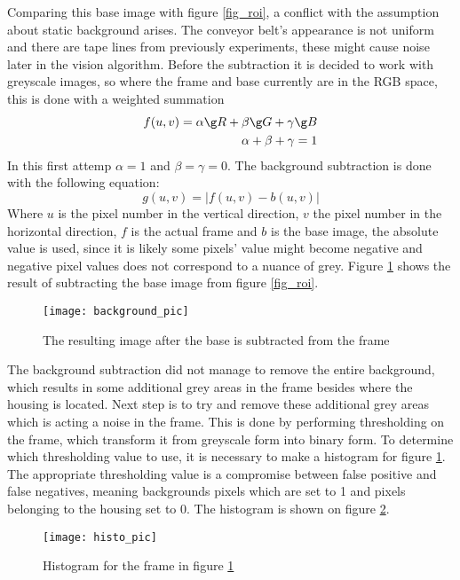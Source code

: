 Comparing this base image with figure \ref{fig_roi}, a conflict with the assumption about static background arises. The conveyor belt's appearance is not uniform and there are tape lines from previously experiments, these might cause noise later in the vision algorithm. Before the subtraction it is decided to work with greyscale images, so where the frame and base currently are in the RGB space, this is done with a weighted summation
\begin{align}
f(u,v)=\alpha\g R+\beta\g G+\gamma \g B\\
\alpha+\beta+\gamma=1
\end{align}
In this first attemp $\alpha=1$ and $\beta=\gamma=0$. The background subtraction is done with the following equation:
\begin{equation}
g(u,v) = |f(u,v)-b(u,v)|
\end{equation} 
Where $u$ is the pixel number in the vertical direction, $v$ the pixel number in the horizontal direction, $f$ is the actual frame and $b$ is the base image, the absolute value is used, since it is likely some pixels' value might become negative and negative pixel values does not correspond to a nuance of grey. Figure \ref{fig_sub} shows the result of subtracting the base image from figure \ref{fig_roi}.\clearpage
\begin{figure}[htbp!]
	\centering
	\texttt{[image: background\_pic]}
	\caption{The resulting image after the base is subtracted from the frame}
	\label{fig_sub}
\end{figure} 
\noindent The background subtraction did not manage to remove the entire background, which results in some additional grey areas in the frame besides where the housing is located.  Next step is to try and remove these additional grey areas which is acting a noise in the frame. This is done by performing thresholding on the frame, which transform it from greyscale form into binary form. To determine which thresholding value to use, it is necessary to make a histogram for figure \ref{fig_sub}. The appropriate thresholding value is a compromise between false positive and false negatives, meaning backgrounds pixels which are set to 1 and pixels belonging to the housing set to 0. The histogram is shown on figure \ref{fig_histo_grey}.
\begin{figure}[htbp!]
	\centering
	\texttt{[image: histo\_pic]}
	\caption{Histogram for the frame in figure \ref{fig_sub}}
	\label{fig_histo_grey}
\end{figure}\\

